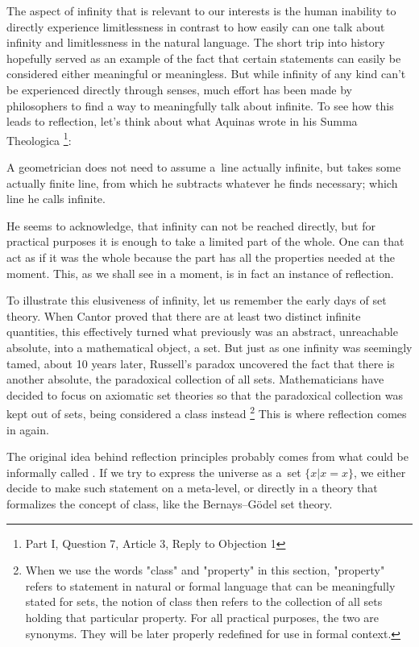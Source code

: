 The aspect of infinity that is relevant to our interests is the human inability to directly experience limitlessness in contrast to how easily can one talk about infinity and limitlessness in the natural language. The short trip into history hopefully served as an example of the fact that certain statements can easily be considered either meaningful or meaningless. 
But while infinity of any kind can't be experienced directly through senses, much effort has been made by philosophers to find a way to meaningfully talk about infinite. 
To see how this leads to reflection, let's think about what Aquinas wrote in his Summa Theologica \footnote{Part I, Question 7, Article 3, Reply to Objection 1}:
\begin{displayquote}
A geometrician does not need to assume a~line actually infinite, but takes some actually finite line, from which he subtracts whatever he finds necessary; which line he calls infinite.
\end{displayquote}
He seems to acknowledge, that infinity can not be reached directly, but for practical purposes it is enough to take a limited part of the whole. One can that act as if it was the whole because the part has all the properties needed at the moment. This, as we shall see in a moment, is in fact an instance of reflection.


To illustrate this elusiveness of infinity, let us remember the early days of set theory. When Cantor proved that there are at least two distinct infinite quantities, this effectively turned what previously was an abstract, unreachable absolute, into a mathematical object, a set. But just as one infinity was seemingly tamed, about 10 years later, Russell's paradox uncovered the fact that there is another absolute, the paradoxical collection of all sets. Mathematicians have decided to focus on axiomatic set theories so that the paradoxical collection was kept out of sets, being considered a class instead \footnote{When we use the words "class" and "property" in this section, "property" refers to statement in natural or formal language that can be meaningfully stated for sets, the notion of class then refers to the collection of all sets holding that particular property. For all practical purposes, the two are synonyms. They will be later properly redefined for use in formal context.}
This is where reflection comes in again. 

The original idea behind reflection principles probably comes from what could be informally called .
If we try to express the universe as a~set $\{x  |  x = x\}$, we either decide to make such statement on a meta-level, or directly in a theory that formalizes the concept of class, like the Bernays–Gödel set theory.


